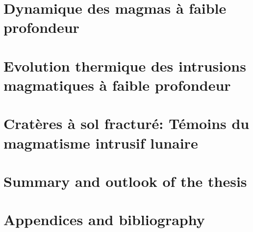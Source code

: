 \documentclass[a4paper,12pt,twoside]{ThesisStyle}
\begin{document}


\dominitoc
\setcounter{tocdepth}{2}

\cleardoublepage



\cleardoublepage





\tableofcontents

\mainmatter
\part{Dynamique des magmas à faible profondeur}

\pagestyle{fancy}




\part{Evolution   thermique  des   intrusions  magmatiques   à  faible
  profondeur}




\part{Cratères à sol fracturé: Témoins du magmatisme intrusif lunaire}




\part{Summary and outlook of the thesis}



\part{Appendices and bibliography}
\appendix







\printnomenclature



\end{document}
